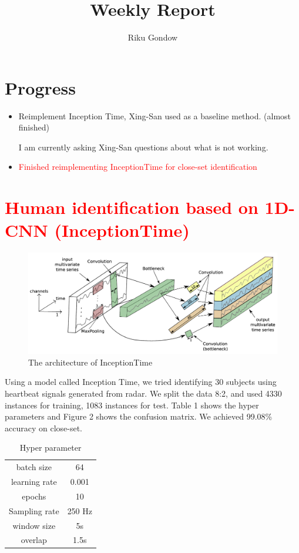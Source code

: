 \documentclass[dvipdfmx]{article}
\begin{document}
\title{Weekly Report}
\author{Riku Gondow}
\maketitle
\section{Progress}
\begin{itemize}
    \item Reimplement Inception Time\cite{Inception}, Xing-San used as a baseline method. (almost finished)

    I am currently asking Xing-San questions about what is not working.

    \item \textcolor{red}{Finished reimplementing InceptionTime for close-set identification}
\end{itemize}

\section{\textcolor{red}{Human identification based on 1D-CNN (InceptionTime)}}

\begin{figure}[H]
\begin{center}
\includegraphics[width=0.8\linewidth]{./img/Incep.png}
\end{center}
\caption{The architecture of InceptionTime}
\end{figure}

Using a model called Inception Time, we tried identifying 30 subjects using heartbeat signals generated from radar.
We split the data 8:2, and used 4330 instances for training, 1083 instances for test.
Table 1 shows the hyper parameters and Figure 2 shows the confusion matrix.
We achieved 99.08\% accuracy on close-set.

\begin{table}[H]
\caption{Hyper parameter}
\centering
\begin{tabular}{cc}
\hline
batch size & 64 \\
learning rate & 0.001 \\
epochs & 10 \\
Sampling rate & 250 Hz \\
window size & 5s \\
overlap & 1.5s \\
\hline
\end{tabular}
\end{table}
\end{document}
